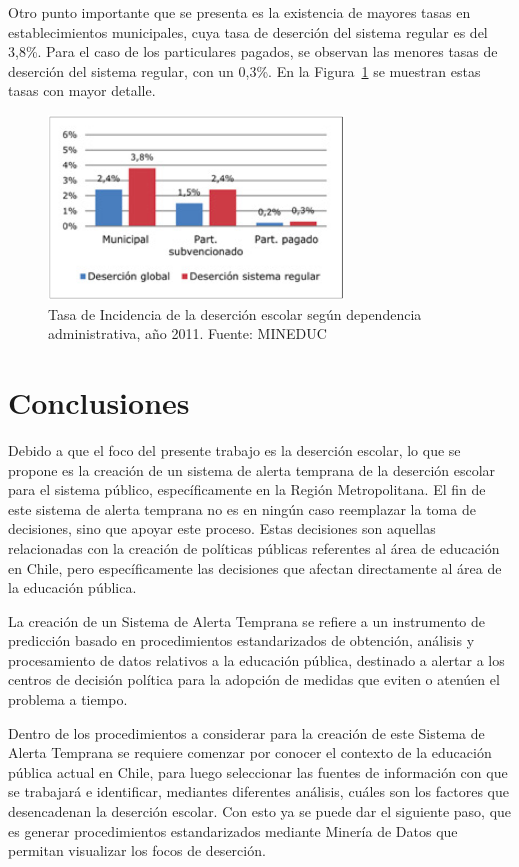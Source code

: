 Otro punto importante que se presenta es la existencia de mayores tasas en establecimientos municipales, cuya tasa de deserción del sistema regular es del 3,8\%. Para el caso de los particulares pagados, se observan las menores tasas de deserción del sistema regular, con un 0,3\%. En la Figura~\ref{fig:admin} se muestran estas tasas con mayor detalle.

\begin{figure}[H]
  \centering
    \includegraphics[width=0.7\textwidth]{Figuras/desercionadmin}
      \caption{Tasa de Incidencia de la deserción escolar según dependencia administrativa, año 2011. Fuente: MINEDUC}
    \label{fig:admin}
\end{figure}

\section{Conclusiones}

Debido a que el foco del presente trabajo es la deserción escolar, lo que se propone es la creación de un sistema de alerta temprana de la deserción escolar para el sistema público, específicamente en la Región Metropolitana. 
El fin de este sistema de alerta temprana no es en ningún caso reemplazar la toma de decisiones, sino que apoyar este proceso. Estas decisiones son aquellas relacionadas con la creación de políticas públicas referentes al área de educación en Chile, pero específicamente las decisiones que afectan directamente al área de la educación pública. 

La creación de un Sistema de Alerta Temprana se refiere a un instrumento de predicción basado en procedimientos estandarizados de obtención, análisis y procesamiento de datos relativos a la educación pública, destinado a alertar a los centros de decisión política para la adopción de medidas que eviten o atenúen el problema a tiempo. 

Dentro de los procedimientos a considerar para la creación de este Sistema de Alerta Temprana se requiere comenzar por conocer el contexto de la educación pública actual en Chile, para luego seleccionar las fuentes de información con que se trabajará e identificar, mediantes diferentes análisis, cuáles son los factores que desencadenan la deserción escolar. Con esto ya se puede dar el siguiente paso, que es generar procedimientos estandarizados mediante Minería de Datos que permitan visualizar los focos de deserción.